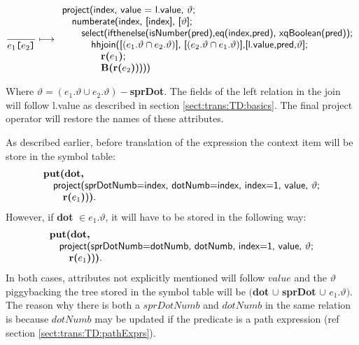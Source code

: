 \begin{equation}
\frac{}{e_1\mbox{\texttt{[}}e_2\mbox{\texttt{]}}}\longmapsto
\begin{array}{l}
\mbox{\textsf{project(index, value = l.value, }}\vartheta\mbox{\textsf{;}} \\ \quad
\mbox{\textsf{numberate(index, [index], [}}\vartheta\mbox{\textsf{];}} \\ \quad\quad
\mbox{\textsf{select(ifthenelse(isNumber(pred),}}
\mbox{\textsf{eq(index,pred), xqBoolean(pred));}} \\\quad\quad\quad
\mbox{\textsf{hhjoin([}}(e_1.\vartheta\cap e_2.\vartheta)\mbox{\textsf{], [}}(e_2.\vartheta\cap e_1.\vartheta)\mbox{\textsf{],}} 
\mbox{\textsf{[l.value,pred,}}\vartheta\mbox{\textsf{];}}
\\\quad\quad\quad\quad
 \mbox{\textbf{r(}}e_1\mbox{\textbf{)}\textsf{;}} \\\quad\quad\quad\quad
\mbox{\textbf{B(r(}}e_2\mbox{\textbf{)}\textsf{))))}} \\
\end{array}
\label{rule:trans:TD:predicate}
\end{equation}

Where $\vartheta=(e_1.\vartheta \cup e_2.\vartheta)-$\textbf{sprDot}. The fields of the left relation in the join
will follow \textsf{l.value} as described in section \ref{sect:trans:TD:basics}. The final \textsf{project}
operator will restore the names of these attributes.

As described earlier, before translation of the expression the context item will be store in the symbol table:
\begin{equation*}
\begin{array}{l}
\mbox{\textbf{put(dot,}} \\ \quad
\mbox{\textsf{project(sprDotNumb=index, dotNumb=index, index=1, value, }}\vartheta\mbox{\textsf{;}} \\ \quad\quad
\mbox{\textbf{r(}}e_1\mbox{\textbf{)}\textsf{)}\textbf{)}}.
\end{array} 
\end{equation*}
However, if \textbf{dot} $\in e_1.\vartheta$, it will have to be stored in the following way:
\begin{equation*}
\begin{array}{l}
\mbox{\textbf{put(dot,}} \\ \quad
\mbox{\textsf{project(sprDotNumb=dotNumb, dotNumb, index=1, value, }}\vartheta\mbox{\textsf{;}} \\ \quad\quad
\mbox{\textbf{r(}}e_1\mbox{\textbf{)}\textsf{)}\textbf{)}}.
\end{array} 
\end{equation*}
In both cases, attributes not explicitly mentioned will follow $value$ and the $\vartheta$ piggybacking the tree
stored in the symbol table will be $($\textbf{dot} $\cup$ \textbf{sprDot} $\cup$ $e_1.\vartheta)$. The reason why
there is both a $sprDotNumb$ and $dotNumb$ in the same relation is because $dotNumb$ may be updated if the predicate is
a path expression (ref section \ref{sect:trans:TD:pathExprs}).

